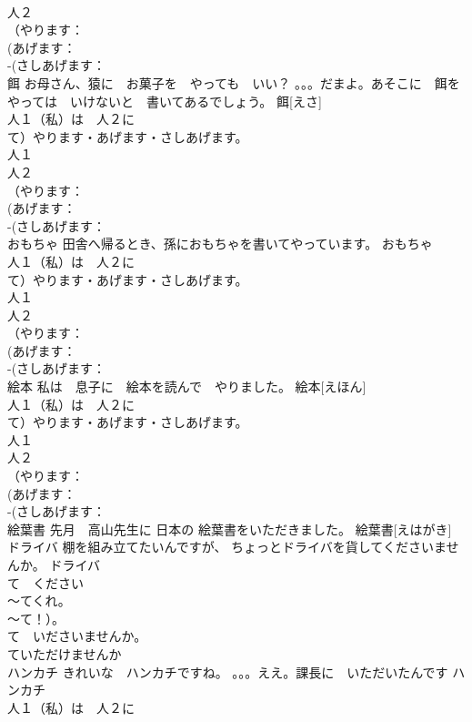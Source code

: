 \documentclass[8pt]{extreport}
\begin{document}
\begin{CJK}{UTF8}{min}
\\	人２
\\	（やります：
\\	(あげます：
\\	-(さしあげます：
\\	餌	お母さん、猿に　お菓子を　やっても　いい？ 。。。だまよ。あそこに　餌を　やっては　いけないと　書いてあるでしょう。	餌[えさ]			
\\	人１（私）は　人２に　
\\	て）やります・あげます・さしあげます。
\\	人１
\\	人２
\\	（やります：
\\	(あげます：
\\	-(さしあげます：
\\	おもちゃ	田舎へ帰るとき、孫におもちゃを書いてやっています。	おもちゃ			
\\	人１（私）は　人２に　
\\	て）やります・あげます・さしあげます。
\\	人１
\\	人２
\\	（やります：
\\	(あげます：
\\	-(さしあげます：
\\	絵本	私は　息子に　絵本を読んで　やりました。	絵本[えほん]			
\\	人１（私）は　人２に　
\\	て）やります・あげます・さしあげます。
\\	人１
\\	人２
\\	（やります：
\\	(あげます：
\\	-(さしあげます：
\\	絵葉書	先月　高山先生に 日本の 絵葉書をいただきました。	絵葉書[えはがき]					
\\	ドライバ	棚を組み立てたいんですが、 ちょっとドライバを貨してくださいませんか。	ドライバ			
\\	て　ください　
\\	～てくれ。
\\	～て！）。　
\\	て　いださいませんか。
\\	ていただけませんか 
\\	ハンカチ	きれいな　ハンカチですね。 。。。ええ。課長に　いただいたんです	ハンカチ			
\\	人１（私）は　人２に　

\end{CJK}
\end{document}
